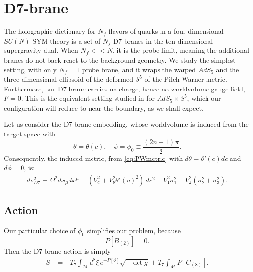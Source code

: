 \section{D7-brane}\label{sec:D7brane}

The holographic dictionary for $N_f$ flavors of quarks in a four dimensional $SU(N)$ SYM theory is a set of $N_f$ D7-branes in the ten-dimensional supergravity dual. When $N_f << N$, it is the probe limit, meaning the additional branes do not back-react to the background geometry. 
We study the simplest setting, with only $N_f=1$ probe brane, and it wraps the warped $AdS_5$ and the three dimensional ellipsoid of the deformed $S^5$ of the Pilch-Warner metric. Furthermore, our D7-brane carries no charge, hence no worldvolume gauge field, $F = 0$. This is the equivalent setting studied in \cite{Karch:2002sh} for $AdS_5 \times S^5$, which our configuration will reduce to near the boundary, as we shall expect.


Let us consider the D7-brane embedding, whose worldvolume is induced from the target space with 
\begin{equation}\label{eq:ansatz}
 \theta = \theta(c), \quad \phi=\phi_0\equiv\frac{(2 n + 1)\pi}{2}.
\end{equation}
Consequently, the induced metric, from \eqref{eq:PWmetric} with $d\theta = \theta'(c) dc$ and $d\phi=0$, is:
\begin{align}\label{eq:PWmetric}
ds_{D7}^2 =
\Omega^2 dx_\mu dx^\mu 
- (V_c^2 +V_\theta^2 \theta'(c)^2)\, dc^2 - V_1^2 \sigma_1^2 - V_2^2 (\sigma_2^2 + \sigma_3^2).
\end{align}


\subsection{Action}

Our particular choice of $\phi_0$ simplifies our problem, because
\begin{equation}
 P[B_{(2)}] = 0.
\end{equation}
Then the D7-brane action is simply
\begin{align}
 S & = -T_7 \int_\mathcal{M} d^8\xi \, e^{-P[\Phi] } \sqrt{-\det g} +
 T_7\int _\mathcal{M} P[C_{(8)}].
\end{align}

